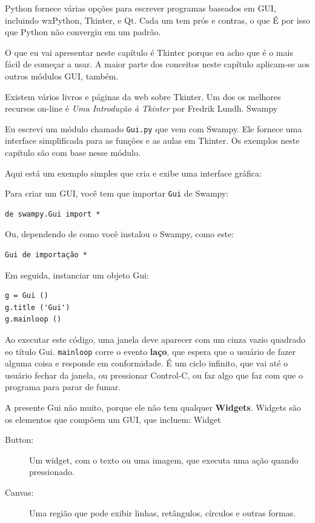 \documentclass[10pt]{book}
\begin{document}
\begin{v erbatim}
Python fornece várias opções para escrever programas baseados em GUI,
incluindo wxPython, Tkinter, e Qt. Cada um tem prós e contras, o que
É por isso que Python não convergiu em um padrão.

O que eu vai apresentar neste capítulo é Tkinter porque eu acho que
é o mais fácil de começar a usar. A maior parte dos conceitos
neste capítulo aplicam-se aos outros módulos GUI, também.

Existem vários livros e páginas da web sobre Tkinter. Um dos
os melhores recursos on-line é {\em Uma Introdução à Tkinter}
por Fredrik Lundh.
\index{} Swampy

Eu escrevi um módulo chamado {\tt Gui.py} que vem com
Swampy. Ele fornece uma interface simplificada para as funções
e as aulas em Tkinter. Os exemplos neste capítulo são
com base nesse módulo.

Aqui está um exemplo simples que cria e exibe uma interface gráfica:

Para criar um GUI, você tem que importar {\tt Gui} de Swampy:
%
\begin{verbatim}
de swampy.Gui import *
\end{verbatim}
%
Ou, dependendo de como você instalou o Swampy, como este:
%
\begin{verbatim}
Gui de importação *
\end{verbatim}
%
Em seguida, instanciar um objeto Gui:
%
\begin{verbatim}
g = Gui ()
g.title ('Gui')
g.mainloop ()
\end{verbatim}
%
Ao executar este código, uma janela deve aparecer com um cinza vazio
quadrado eo título {\sf Gui}. {\tt mainloop} corre o evento {\bf
  laço}, que espera que o usuário de fazer alguma coisa e responde
em conformidade. É um ciclo infinito, que vai até o usuário fechar
da janela, ou pressionar Control-C, ou faz algo que faz com que o
programa para parar de fumar.

A presente Gui não muito, porque ele não tem qualquer
{\bf Widgets}. Widgets são os elementos que compõem um
GUI, que incluem:
\index{} Widget

\begin{description}

\item[Button:] Um widget, com o texto ou uma imagem, que
executa uma ação quando pressionado.

\item[Canvas:] Uma região que pode exibir linhas, retângulos,
círculos e outras formas.


\end{description}
\end{v erbatim}
\end{document}
